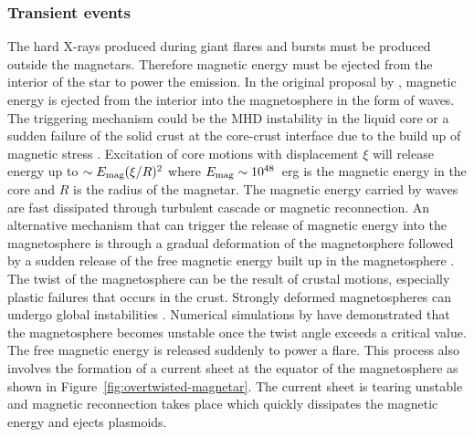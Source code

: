 \subsubsection{Transient events}
The hard X-rays produced during giant flares and bursts must be produced outside the magnetars. 
Therefore magnetic energy must be ejected from the interior of the star to power the emission.
In the original proposal by \citet{1995MNRAS.275..255T,1996ApJ...473..322T}, magnetic energy is ejected from the interior into the magnetosphere in the form of \alfven waves.
The triggering mechanism could be the MHD instability in the liquid core or a sudden failure of the solid crust at the core-crust interface due to the build up of magnetic stress \citep{1995MNRAS.275..255T,2001ApJ...561..980T}.
Excitation of core motions with displacement $\xi$ will release energy up to $\sim E_{\rm mag}(\xi/R)^2$ where $E_{\rm mag}\sim 10^{48}$~erg is the magnetic energy in the core and $R$ is the radius of the magnetar.
The magnetic energy carried by \alfven waves are fast dissipated through turbulent cascade or magnetic reconnection.
An alternative mechanism that can trigger the release of magnetic energy into the magnetosphere is through a gradual deformation of the magnetosphere followed by a sudden release of the free magnetic energy built up in the magnetosphere \citep{2003MNRAS.346..540L,2010MNRAS.407.1926G, 2013ApJ...774...92P}.
The twist of the magnetosphere can be the result of crustal motions, especially plastic failures that occurs in the crust.
Strongly deformed magnetospheres can undergo global instabilities \citep{2002ApJ...572..432U}.
Numerical simulations by \citet{2013ApJ...774...92P} have demonstrated that the magnetosphere becomes unstable once the twist angle exceeds a critical value.
The free magnetic energy is released suddenly to power a flare.
This process also involves the formation of a current sheet at the equator of the magnetosphere as shown in Figure~\ref{fig:overtwisted-magnetar}.
The current sheet is tearing unstable and magnetic reconnection takes place which quickly dissipates the magnetic energy and ejects plasmoids.
%
